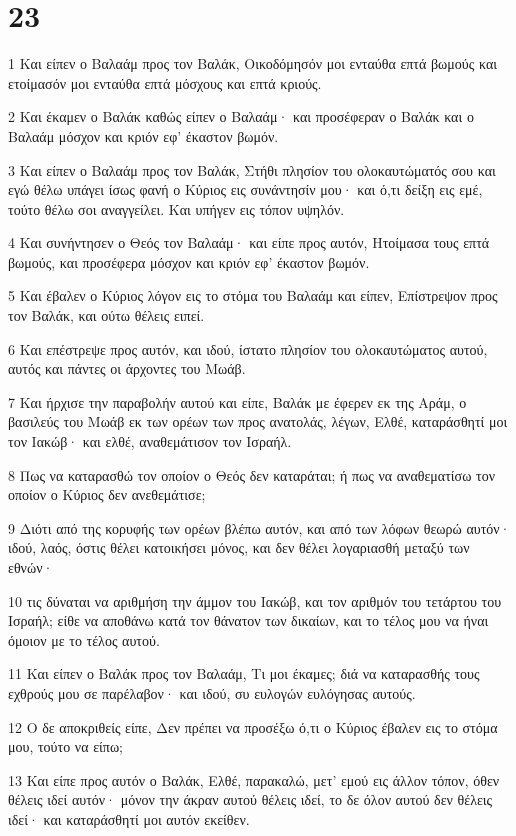 \chapter{23}

\par 1 Και είπεν ο Βαλαάμ προς τον Βαλάκ, Οικοδόμησόν μοι ενταύθα επτά βωμούς και ετοίμασόν μοι ενταύθα επτά μόσχους και επτά κριούς.
\par 2 Και έκαμεν ο Βαλάκ καθώς είπεν ο Βαλαάμ· και προσέφεραν ο Βαλάκ και ο Βαλαάμ μόσχον και κριόν εφ' έκαστον βωμόν.
\par 3 Και είπεν ο Βαλαάμ προς τον Βαλάκ, Στήθι πλησίον του ολοκαυτώματός σου και εγώ θέλω υπάγει ίσως φανή ο Κύριος εις συνάντησίν μου· και ό,τι δείξη εις εμέ, τούτο θέλω σοι αναγγείλει. Και υπήγεν εις τόπον υψηλόν.
\par 4 Και συνήντησεν ο Θεός τον Βαλαάμ· και είπε προς αυτόν, Ητοίμασα τους επτά βωμούς, και προσέφερα μόσχον και κριόν εφ' έκαστον βωμόν.
\par 5 Και έβαλεν ο Κύριος λόγον εις το στόμα του Βαλαάμ και είπεν, Επίστρεψον προς τον Βαλάκ, και ούτω θέλεις ειπεί.
\par 6 Και επέστρεψε προς αυτόν, και ιδού, ίστατο πλησίον του ολοκαυτώματος αυτού, αυτός και πάντες οι άρχοντες του Μωάβ.
\par 7 Και ήρχισε την παραβολήν αυτού και είπε, Βαλάκ με έφερεν εκ της Αράμ, ο βασιλεύς του Μωάβ εκ των ορέων των προς ανατολάς, λέγων, Ελθέ, καταράσθητί μοι τον Ιακώβ· και ελθέ, αναθεμάτισον τον Ισραήλ.
\par 8 Πως να καταρασθώ τον οποίον ο Θεός δεν καταράται; ή πως να αναθεματίσω τον οποίον ο Κύριος δεν ανεθεμάτισε;
\par 9 Διότι από της κορυφής των ορέων βλέπω αυτόν, και από των λόφων θεωρώ αυτόν· ιδού, λαός, όστις θέλει κατοικήσει μόνος, και δεν θέλει λογαριασθή μεταξύ των εθνών·
\par 10 τις δύναται να αριθμήση την άμμον του Ιακώβ, και τον αριθμόν του τετάρτου του Ισραήλ; είθε να αποθάνω κατά τον θάνατον των δικαίων, και το τέλος μου να ήναι όμοιον με το τέλος αυτού.
\par 11 Και είπεν ο Βαλάκ προς τον Βαλαάμ, Τι μοι έκαμες; διά να καταρασθής τους εχθρούς μου σε παρέλαβον· και ιδού, συ ευλογών ευλόγησας αυτούς.
\par 12 Ο δε αποκριθείς είπε, Δεν πρέπει να προσέξω ό,τι ο Κύριος έβαλεν εις το στόμα μου, τούτο να είπω;
\par 13 Και είπε προς αυτόν ο Βαλάκ, Ελθέ, παρακαλώ, μετ' εμού εις άλλον τόπον, όθεν θέλεις ιδεί αυτόν· μόνον την άκραν αυτού θέλεις ιδεί, το δε όλον αυτού δεν θέλεις ιδεί· και καταράσθητί μοι αυτόν εκείθεν.
